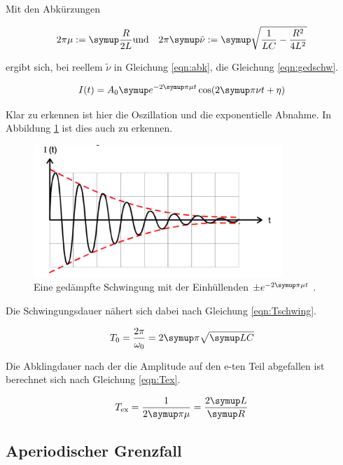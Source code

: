 Mit den Abkürzungen

\begin{align}
  2 \pi \mu := \g{\frac{R}{2 L}} & \text{und} & 2 \pi \g{\tilde{\nu}} := \g{\sqrt{\frac{1}{L C} - \frac{R^2}{4 L^2}}}
  \label{eqn:abk}
\end{align}

ergibt sich, bei reellem $\tilde{\nu}$ in Gleichung \eqref{eqn:abk}, die Gleichung \eqref{eqn:gedschw}.

\begin{equation}
  I(t) = A_0 \g{e}^{-2 \g{\pi} \mu t} \cos(2 \g{\pi} \nu t + \eta)
  \label{eqn:gedschw}
\end{equation}

Klar zu erkennen ist hier die Oszillation und die exponentielle Abnahme.
In Abbildung \ref{fig:gedschw} ist dies auch zu erkennen.

\begin{figure}[h]
  \centering
  \includegraphics[height = 5cm]{gedschw.pdf}
  \caption{Eine gedämpfte Schwingung mit der Einhüllenden $\pm e^{-2\g{\pi}\mu t}$ \cite{anleitung}.}
  \label{fig:gedschw}
\end{figure}

Die Schwingungsdauer nähert sich dabei nach Gleichung \eqref{eqn:Tschwing}.

\begin{equation}
  T_{\text{0}} = \frac{2 \pi}{\omega_0} = 2 \g{\pi}\sqrt{\g{LC}}
  \label{eqn:Tschwing}
\end{equation}

Die Abklingdauer nach der die Amplitude auf den e-ten Teil abgefallen ist
berechnet sich nach Gleichung \eqref{eqn:Tex}.

\begin{equation}
  T_{\text{ex}} = \frac{1}{2\g{\pi}\mu} = \frac{2\g{L}}{\g{R}}
\end{equation}

\subsection{Aperiodischer Grenzfall}

